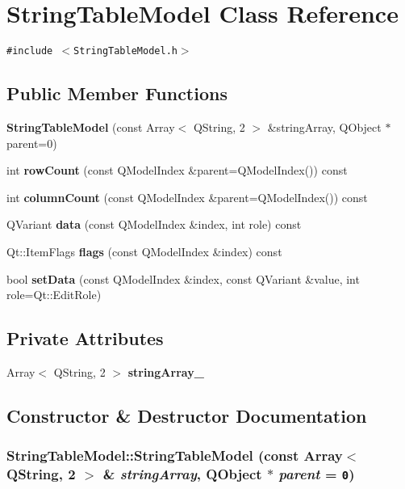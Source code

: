 \section{StringTableModel Class Reference}
\label{classStringTableModel}
{\tt \#include $<$StringTableModel.h$>$}

\subsection*{Public Member Functions}
\begin{CompactItemize}
\item 
{\bf StringTableModel} (const Array$<$ QString, 2 $>$ \&stringArray, QObject $\ast$parent=0)
\item 
int {\bf rowCount} (const QModelIndex \&parent=QModelIndex()) const 
\item 
int {\bf columnCount} (const QModelIndex \&parent=QModelIndex()) const 
\item 
QVariant {\bf data} (const QModelIndex \&index, int role) const 
\item 
Qt::ItemFlags {\bf flags} (const QModelIndex \&index) const 
\item 
bool {\bf setData} (const QModelIndex \&index, const QVariant \&value, int role=Qt::EditRole)
\end{CompactItemize}
\subsection*{Private Attributes}
\begin{CompactItemize}
\item 
Array$<$ QString, 2 $>$ {\bf stringArray\_\-}
\end{CompactItemize}


\subsection{Constructor \& Destructor Documentation}
\subsubsection{\setlength{\rightskip}{0pt plus 5cm}StringTableModel::StringTableModel (const Array$<$ QString, 2 $>$ \& {\em stringArray}, \/  QObject $\ast$ {\em parent} = {\tt 0})}\label{classStringTableModel_d607fe9c6fbf91af1559adddd87c2d48}





